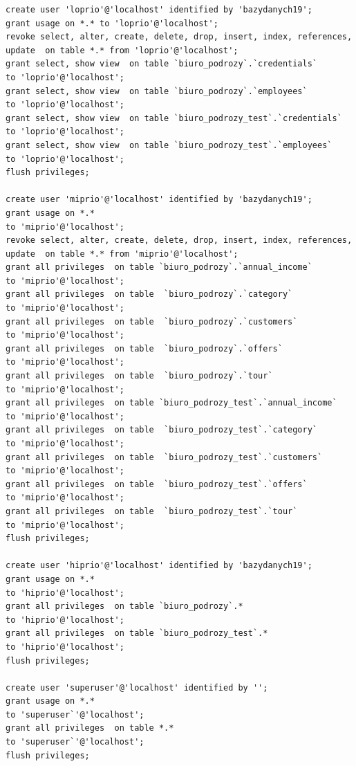 \documentclass[polish,polish,a4paper]{article}
\begin{document}
\begin{lstlisting}
create user 'loprio'@'localhost' identified by 'bazydanych19';
grant usage on *.* to 'loprio'@'localhost';
revoke select, alter, create, delete, drop, insert, index, references, update  on table *.* from 'loprio'@'localhost';
grant select, show view  on table `biuro_podrozy`.`credentials`
to 'loprio'@'localhost';
grant select, show view  on table `biuro_podrozy`.`employees`
to 'loprio'@'localhost';
grant select, show view  on table `biuro_podrozy_test`.`credentials`
to 'loprio'@'localhost';
grant select, show view  on table `biuro_podrozy_test`.`employees`
to 'loprio'@'localhost';
flush privileges;

create user 'miprio'@'localhost' identified by 'bazydanych19';
grant usage on *.*
to 'miprio'@'localhost';
revoke select, alter, create, delete, drop, insert, index, references, update  on table *.* from 'miprio'@'localhost';
grant all privileges  on table `biuro_podrozy`.`annual_income`
to 'miprio'@'localhost';
grant all privileges  on table  `biuro_podrozy`.`category`
to 'miprio'@'localhost';
grant all privileges  on table  `biuro_podrozy`.`customers`
to 'miprio'@'localhost';
grant all privileges  on table  `biuro_podrozy`.`offers`
to 'miprio'@'localhost';
grant all privileges  on table  `biuro_podrozy`.`tour`
to 'miprio'@'localhost';
grant all privileges  on table `biuro_podrozy_test`.`annual_income`
to 'miprio'@'localhost';
grant all privileges  on table  `biuro_podrozy_test`.`category`
to 'miprio'@'localhost';
grant all privileges  on table  `biuro_podrozy_test`.`customers`
to 'miprio'@'localhost';
grant all privileges  on table  `biuro_podrozy_test`.`offers`
to 'miprio'@'localhost';
grant all privileges  on table  `biuro_podrozy_test`.`tour`
to 'miprio'@'localhost';
flush privileges;

create user 'hiprio'@'localhost' identified by 'bazydanych19';
grant usage on *.*
to 'hiprio'@'localhost';
grant all privileges  on table `biuro_podrozy`.*
to 'hiprio'@'localhost';
grant all privileges  on table `biuro_podrozy_test`.*
to 'hiprio'@'localhost';
flush privileges;

create user 'superuser'@'localhost' identified by '';
grant usage on *.*
to 'superuser`'@'localhost';
grant all privileges  on table *.*
to 'superuser`'@'localhost';
flush privileges;


\end{lstlisting}
\end{document}

